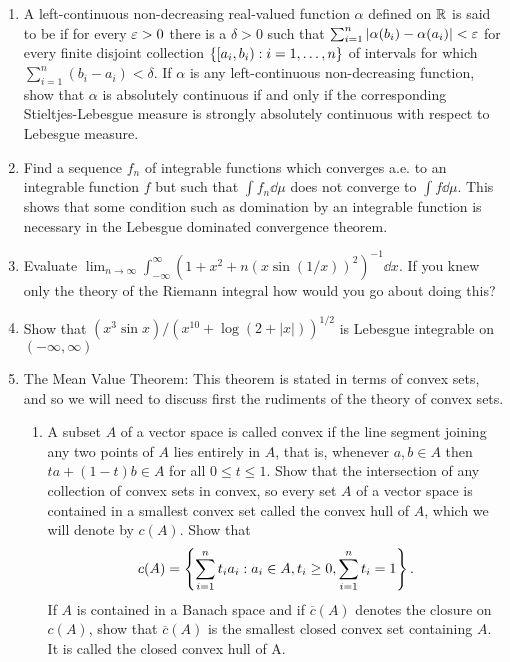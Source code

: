 \begin{enumerate}[label=\arabic*),ref=\arabic*]
\item A left-continuous non-decreasing real-valued function $\alpha$ defined on $\mathbb{R}$ is said to be  if for every $\varepsilon>0$ there is a $\delta>0$ such that $\sum_{i=1}^n|\alpha(b_i)-\alpha(a_i)|<\varepsilon$ for every finite disjoint collection $\left\{[a_i, b_i): i=1,\dots, n\right\}$ of intervals for which $\sum_{i=1}^n(b_i-a_i)<\delta$. If $\alpha$ is any left-continuous non-decreasing function, show that $\alpha$ is absolutely continuous if and only if the corresponding Stieltjes-Lebesgue measure is strongly absolutely continuous with respect to Lebesgue measure.

\item Find a sequence $f_n$ of integrable functions which converges a.e. to an integrable function $f$ but such that $\int f_n\dd\mu$ does not converge to $\int f\dd\mu$. This shows that some condition such as domination by an integrable function is necessary in the Lebesgue dominated convergence theorem.

\item Evaluate $\lim_{n\to\infty}\int_{-\infty}^\infty(1+x^2+n(x\sin(1/x))^2)^{-1}\dd x$. If you knew only the theory of the Riemann integral how would you go about doing this?

\item Show that $(x^3 \sin x)/(x^{10}+\log(2+|x|))^{1/2}$ is Lebesgue integrable on $(-\infty,\infty)$

\item\label{exer:mvt}
The Mean Value Theorem: This theorem is stated in terms of convex sets, and so we will need to discuss first the rudiments of the theory of convex sets.
\begin{enumerate}[label=\alph*)]
    \item A subset $A$ of a vector space is called convex if the line segment joining any two points of $A$ lies entirely in $A$, that is, whenever $a,b\in A$ then $ta+(1-t)b \in A$ for all $0\leq t\leq1$. Show that the intersection of any collection of convex sets in convex, so every set $A$ of a vector space is contained in a smallest convex set called the convex hull of $A$, which we will denote by $c(A)$. Show that \[c(A)=\left\{\sum_{i=1}^nt_ia_i:a_i \in A,t_i\geq0,\sum_{i=1}^nt_i=1\right\}.\] If $A$ is contained in a Banach space and if $\overline{c}(A)$ denotes the closure on $c(A)$, show that $\overline{c}(A)$ is the smallest closed convex set containing $A$. It is called the closed convex hull of A.
    

\end{enumerate}
\end{enumerate}
